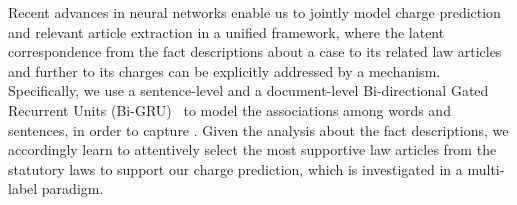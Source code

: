 Recent advances in neural networks enable us to jointly model charge prediction and relevant 
article extraction in a unified framework, %
where the latent correspondence from the fact descriptions about a case to its related law articles 
and further to its charges can be explicitly addressed by a  mechanism.
Specifically,   %
we use a sentence-level and a document-level Bi-directional Gated Recurrent Units (Bi-GRU)~\cite{bahdanau2015neural}  to model the associations among words and sentences, in order to capture .  
Given the analysis about the fact descriptions, we accordingly learn  to attentively select the most supportive law articles from the statutory laws  to support our charge prediction, which is investigated in a multi-label paradigm.

